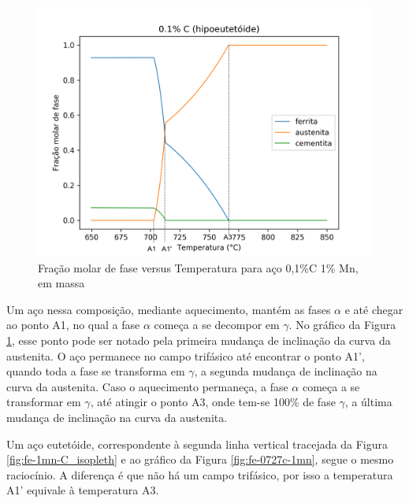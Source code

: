 \documentclass[brazil,tf,epusp]{usp}  %
\begin{document}
\begin{figure}[ht!]
  \includegraphics[width=1.1\textwidth]{img/Fe-Mn-01C_edited.png}
  \caption{Fração molar de fase versus Temperatura para aço 0,1\%C 1\% Mn, em massa}
  \label{fig:fe-01c-1mn}
\end{figure}

Um aço nessa composição, mediante aquecimento, mantém as fases $\alpha$ e  até chegar ao ponto A1, no qual a fase $\alpha$ começa a se decompor em $\gamma$. No gráfico da Figura \ref{fig:fe-01c-1mn}, esse ponto pode ser notado pela primeira mudança de inclinação da curva da austenita. O aço permanece no campo trifásico até encontrar o ponto A1', quando toda a fase  se transforma em $\gamma$, a segunda mudança de inclinação na curva da austenita. Caso o aquecimento permaneça, a fase $\alpha$ começa a se transformar em $\gamma$, até atingir o ponto A3, onde tem-se 100\% de fase $\gamma$, a última mudança de inclinação na curva da austenita.

Um aço eutetóide, correspondente à segunda linha vertical tracejada da Figura \ref{fig:fe-1mn-C_isopleth} e ao gráfico da Figura \ref{fig:fe-0727c-1mn}, segue o mesmo raciocínio. A diferença é que não há um campo trifásico, por isso a temperatura A1' equivale à temperatura A3.
\end{document}
